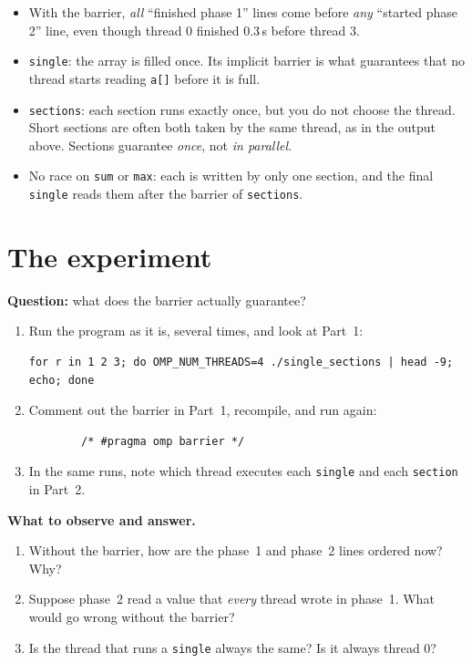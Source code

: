 \documentclass[11pt,a4paper]{article}
\begin{document}
\begin{keyidea}
\begin{itemize}
  \item With the barrier, \emph{all} ``finished phase 1'' lines come before
        \emph{any} ``started phase 2'' line, even though thread 0 finished 0.3\,s
        before thread 3.
  \item \texttt{single}: the array is filled once. Its implicit barrier is what
        guarantees that no thread starts reading \texttt{a[]} before it is full.
  \item \texttt{sections}: each section runs exactly once, but you do not choose the
        thread. Short sections are often both taken by the same thread, as in the
        output above. Sections guarantee \emph{once}, not \emph{in parallel}.
  \item No race on \texttt{sum} or \texttt{max}: each is written by only one section,
        and the final \texttt{single} reads them after the barrier of \texttt{sections}.
\end{itemize}
\end{keyidea}

\section{The experiment}
\begin{experiment}
\textbf{Question:} what does the barrier actually guarantee?
\begin{enumerate}
  \item Run the program as it is, several times, and look at Part~1:
\begin{lstlisting}[style=sh]
for r in 1 2 3; do OMP_NUM_THREADS=4 ./single_sections | head -9; echo; done
\end{lstlisting}
  \item Comment out the barrier in Part~1, recompile, and run again:
\begin{lstlisting}
        /* #pragma omp barrier */
\end{lstlisting}
  \item In the same runs, note which thread executes each \texttt{single} and each
        \texttt{section} in Part~2.
\end{enumerate}
\textbf{What to observe and answer.}
\begin{enumerate}
  \item Without the barrier, how are the phase~1 and phase~2 lines ordered now? Why?
  \item Suppose phase~2 read a value that \emph{every} thread wrote in phase~1. What would
        go wrong without the barrier?
  \item Is the thread that runs a \texttt{single} always the same? Is it always thread 0?
\end{enumerate}
\end{experiment}
\end{document}
